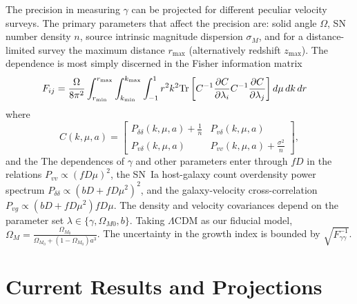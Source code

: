 \documentclass[11pt, oneside]{article}   	%
\begin{document}
The precision  in measuring $\gamma$ can be projected for different peculiar velocity surveys.
The primary  parameters that affect the precision are: solid angle $\Omega$, SN number density $n$, source intrinsic
magnitude dispersion $\sigma_M$, and for a distance-limited survey the maximum distance $r_{\text{max}}$ (alternatively redshift $z_{\text{max}}$).
The dependence is most simply discerned 
in the  Fisher information matrix
\begin{align}
F_{ij} 
& = \frac{\Omega}{8\pi^2} \int_{r_{\rm min}}^{r_{\rm max}}  \int_{k_{\rm min}}^{k_{\rm max}}  \int_{-1}^{1} r^2 k^2 \text{Tr}\left[ C^{-1} \frac{\partial C}{\partial \lambda_i} C^{-1}
\frac{\partial C}{\partial \lambda_j} \right] d\mu\,dk\,dr
\label{fisher:eqn}
\end{align}
where
\begin{equation}
C(k,\mu,a)  =
  \begin{bmatrix}
   P_{\delta \delta}(k,\mu,a) + \frac{1}{n} &
   P_{v\delta}(k,\mu,a)  \\
   P_{v\delta}(k,\mu,a)  &
  P_{vv}(k,\mu,a) + \frac{\sigma^2}{n}
   \end{bmatrix},
\label{cov:eq}
\end{equation}
and the
The dependences of $\gamma$ and other parameters enter through $fD$ in the relations $P_{vv}\propto (fD\mu)^2$, the SN~Ia host-galaxy count overdensity
power spectrum $P_{\delta \delta }\propto (bD + fD\mu^2)^2$, and the galaxy-velocity cross-correlation $P_{vg}
\propto  (bD + fD\mu^2)fD\mu$.  
 The density and velocity covariances depend on the parameter set $\lambda \in \{\gamma, \Omega_{M0}, b\}$.
Taking $\Lambda$CDM as our fiducial model, 
$\Omega_M=\frac{\Omega_{M_0}}{\Omega_{M_0} + (1-\Omega_{M_0})a^3}$.  
The uncertainty in the growth index is bounded by $\sqrt{F^{-1}_{\gamma \gamma}}$.

\section{Current Results and Projections}
\end{document}
